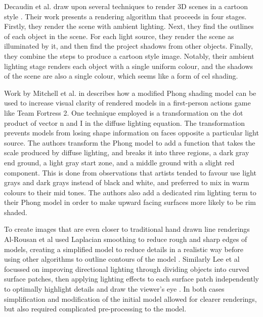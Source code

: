 Decaudin et al. draw upon several techniques to render 3D scenes in a cartoon style 
\cite{decaudin96}. Their work presents a rendering algorithm that proceeds in four stages. 
Firstly, they render the scene with ambient lighting. Next, they find the outlines of each 
object in the scene. For each light source, they render the scene as illuminated by it, and 
then find the project shadows from other objects. Finally, they combine the steps to produce 
a cartoon style image. Notably, their ambient lighting stage renders each object with a 
single uniform colour, and the shadows of the scene are also a single colour, which seems 
like a form of cel shading.

Work by Mitchell et al. in \cite{mitchell07} describes how a modified Phong shading model can
be used to increase visual clarity of rendered models in a first-person actions game like Team
Fortress 2. One technique employed is a transformation on the dot product of vector n and I in 
the diffuse lighting equation. The transformation prevents models from losing shape information
on faces opposite a particular light source. The authors transform the Phong model
to add a function that takes the scale produced by diffuse lighting, and breaks it into three 
regions, a dark gray end ground, a light gray start zone, and a middle ground with a slight 
red component. This is done from observations that artists tended to favour use light grays and
dark grays instead of black and white, and preferred to mix in warm colours to their mid tones. 
The authors also add a dedicated rim lighting term to their Phong model in order to make upward
facing surfaces more likely to be rim shaded.

To create images that are even closer to traditional hand drawn line renderings Al-Rousan et al used Laplacian smoothing to reduce rough and sharp edges of models, creating a simplified model to reduce details in a realistic way before using other algorithms to outline contours of the model \cite{riyad16}. Similarly Lee et al focussed on improving directional lighting through dividing objects into curved surface patches, then applying lighting effects to each surface patch independently to optimally highlight details and draw the viewer's eye \cite{lee06}. In both cases simplification and modification of the initial model allowed for clearer renderings, but also required complicated pre-processing to the model.